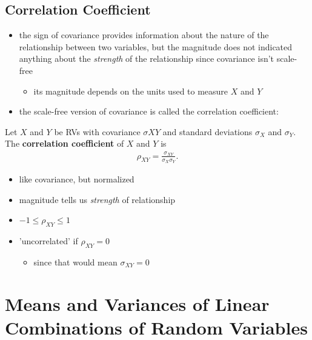 \documentclass[10pt]{article}
\begin{document}
\subsection{Correlation Coefficient}
\begin{itemize}
    \item the sign of covariance provides information about the nature of the relationship between two variables, but the magnitude does not indicated anything about the \textit{strength} of the relationship since covariance isn't scale-free
        \begin{itemize}
            \item its magnitude depends on the units used to measure $X$ and $Y$
        \end{itemize}
    \item the scale-free version of covariance is called the correlation coefficient:
\end{itemize}
\begin{definition}
    Let $X$ and $Y$ be RVs with covariance $\sigma{XY}$ and standard deviations $\sigma_X$ and $\sigma_Y$. The \textbf{correlation coefficient} of $X$ and $Y$ is 
    \begin{align*}
        \rho_{XY} = \frac{\sigma_{XY}}{\sigma_X \sigma_Y}
    .\end{align*}
\end{definition}
\begin{itemize}
    \item like covariance, but normalized
    \item magnitude tells us \textit{strength} of relationship 
    \item $-1 \le \rho_{XY} \le 1$
    \item 'uncorrelated' if $\rho_{XY} = 0$
        \begin{itemize}
            \item since that would mean $\sigma_{XY} = 0$
        \end{itemize}
\end{itemize}


\section{Means and Variances of Linear Combinations of Random Variables}
\end{document}
